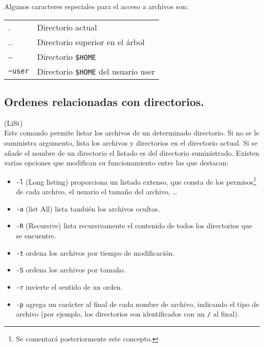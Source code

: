 Algunos caracteres especiales para el acceso a archivos son:

\begin{tabular}{ll}
 . &Directorio actual \\
.. &Directorio superior en el {\'a}rbol \\
\~ &Directorio {\tt \$HOME} \\
{\tt \~\!user} &Directorio {\tt \$HOME} del usuario user\\
\end{tabular}

\subsection{Ordenes relacionadas con directorios.}

 (LiSt)\\
Este comando permite listar los archivos de un determinado directorio.
Si no se le suministra argumento, lista los archivos y directorios en
el directorio actual. Si se a{\~n}ade el nombre de un directorio el
listado es del directorio suministrado. Existen varias opciones que
modifican su funcionamiento entre las que destacan:

\begin{itemize}
\item {\verb+-l+} (Long listing) proporciona un listado extenso, que
  consta de los permisos\footnote{Se comentar{\'a} posteriormente este
    concepto.} de cada archivo, el usuario el tama{\~n}o del archivo, \ldots

\item {\verb+-a+} (list All) lista tambi{\'e}n los archivos ocultos.
  
\item {\verb+-R+} (Recursive) lista recursivamente el contenido de todos
  los directorios que se encuentre.
  
\item {\verb+-t+} ordena los archivos por tiempo de modificaci{\'o}n.

\item {\verb+-S+} ordena los archivos por tama{\~n}o.

\item {\verb+-r+} invierte el sentido de un orden.

\item \verb+-p+ agrega un car\'acter al final de cada nombre de
  archivo, indicando el tipo de archivo (por ejemplo, los directorios
  son identificados con un \verb+/+ al final).

\end{itemize}

